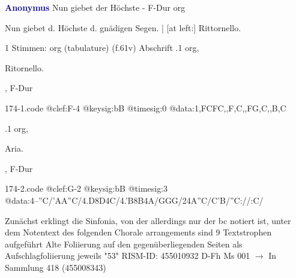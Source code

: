 \documentclass[twocolumn]{book}
\begin{document}
\newline \par \vspace{7pt} \textcolor{darkblue}{\textbf{Anonymus  }}
\newline Nun giebet der Höchste - F-Dur
\newline org
\newline \begin{itshape}[heading, f.61v:] Nun giebet d. Höchste d. gnädigen Segen. | [at left:] Rittornello.\end{itshape} 
\newline \textcolor{darkblue}{}  1 Stimmen: org (tabulature)  (f.61v)
\newline Abschrift
.1  org, \begin{itshape}Ritornello.\end{itshape}, F-Dur  
\begin{filecontents*}{174-1.code}
@clef:F-4
@keysig:bB
@timesig:0
@data:1,FCFC,,F,C,,FG,C,,B,C
\end{filecontents*}
\newline
%
.1  org, \begin{itshape}Aria.\end{itshape}, F-Dur  
\begin{filecontents*}{174-2.code}
@clef:G-2
@keysig:bB
@timesig:3
@data:4--''C/'AA''C/4.D8D4C/4.'B8B4A/GGG/24A''C/C'B/''C://:C/
\end{filecontents*}
\newline
%
\newline Zunächst erklingt die Sinfonia, von der allerdings nur der bc notiert ist, unter dem Notentext des folgenden Chorale arrangements sind 9 Textstrophen aufgeführt
\newline Alte Foliierung auf den gegenüberliegenden Seiten als Aufschlagfoliierung jeweils "53"
\newline RISM-ID: 455010932
\newline D-Fh  Ms 001
\newline $\rightarrow$ In Sammlung 418 (455008343)
      
\end{document}
